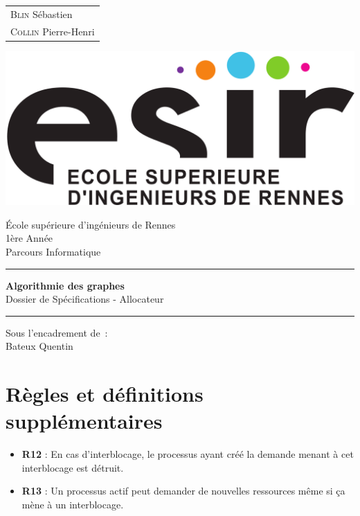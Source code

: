 \documentclass{article}
\newcommand{\bitem}{\item[\textbullet]}
\begin{document}
\begin{titlepage}
	\vspace{-20px}
	\begin{tabular}{l}
		\textsc{Blin} S\'ebastien\\
		\textsc{Collin} Pierre-Henri
	\end{tabular}
	\hfill \vspace{10px}\includegraphics[scale=0.1]{esir.png}\\
	\vfill
	\begin{center}
		\Huge{\'Ecole sup\'erieure d'ing\'enieurs de Rennes}\\
		\vspace{1cm}
		\LARGE{1\`ere Ann\'ee}\\
		\large{Parcours Informatique}\\
		\vspace{0.5cm}\hrule\vspace{0.5cm}
		\LARGE{\textbf{Algorithmie des graphes}}\\
		\Large{Dossier de Spécifications - Allocateur}
		\vspace{0.5cm}\hrule
		\vfill
		\vfill
	\end{center}
	\begin{flushleft}
		\Large{Sous l'encadrement de~:}\\
		\vspace{0.2cm}
		\large{{Bateux} Quentin}
	\end{flushleft}
	\vfill
\end{titlepage}

\section{Règles et définitions supplémentaires}
\begin{itemize}
  \bitem \textbf{R12} : En cas d'interblocage, le processus ayant créé la demande menant à cet interblocage est détruit.
  \bitem \textbf{R13} : Un processus actif peut demander de nouvelles ressources même si ça mène à un interblocage.
\end{itemize}
\end{document}

